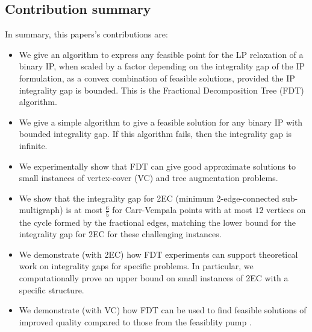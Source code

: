 \subsection{Contribution summary}
In summary, this papers's contributions are:
\begin{itemize}
\item We give an algorithm to express any feasible point for the LP relaxation of a binary IP, when scaled by a factor depending on the integrality gap of the IP formulation, 
as a convex combination of feasible solutions, provided the IP integrality gap is bounded.  This is the Fractional Decomposition Tree (FDT) algorithm.
\item We give a simple  algorithm to give a feasible solution for any binary IP with bounded integrality gap. If this algorithm fails, then the integrality gap is infinite.
\item We experimentally show that FDT can give good approximate solutions to small instances of vertex-cover (VC) and tree augmentation problems.
\item We show that the integrality gap for 2EC (minimum 2-edge-connected sub-multigraph) is at most $\frac{6}{5}$ for Carr-Vempala points with at most $12$ vertices on the cycle formed by the fractional edges, matching the lower bound for the integrality gap for 2EC for these challenging instances.
\item We demonstrate (with 2EC) how FDT experiments can support theoretical work on integrality gaps for specific problems. In particular, we computationally prove an upper bound on small instances of 2EC with a specific structure.
\item We demonstrate (with VC) how FDT can be used to find feasible solutions of improved quality compared to those from the feasiblity pump \cite{fp1}.
\end{itemize}


